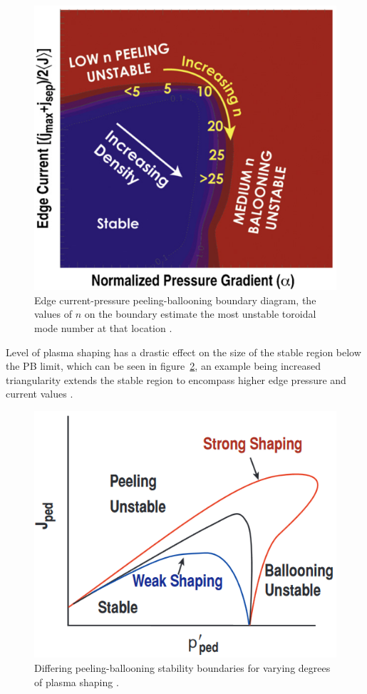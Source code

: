 \documentclass[12pt]{article}  %
\begin{document}
\begin{figure}
\includegraphics[scale=0.5]{Figures/PBmodenumbers.png}
\centering
\caption{Edge current-pressure peeling-ballooning boundary diagram, the values of $n$ on the boundary estimate the most unstable toroidal mode number at that location \cite{Wade2009}.}\label{fig:PBmodenumbers}
\end{figure}

Level of plasma shaping has a drastic effect on the size of the stable region below the PB limit, which can be seen in figure~\ref{fig:PBshaping}, an example being increased triangularity extends the stable region to encompass higher edge pressure and current values \cite{Lang2013}.

\begin{figure}
\includegraphics[scale=0.6]{Figures/PBshaping.png}
\centering
\caption{Differing peeling-ballooning stability boundaries for varying degrees of plasma shaping \cite{Snyder2004}.}\label{fig:PBshaping}
\end{figure}
\end{document}
